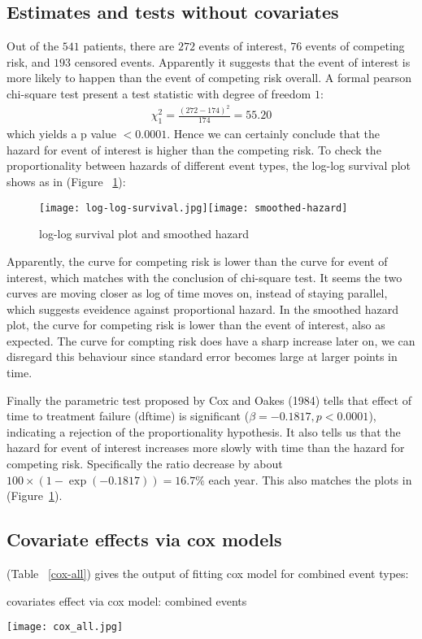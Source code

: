 \documentclass[times, doublespace]{simauth}
\begin{document}
\subsection{Estimates and tests without covariates}
Out of the $541$ patients, there are $272$ events of interest, $76$ events of competing risk, and $193$ censored events. Apparently it suggests that the event of interest is more likely to happen than the event of competing risk overall. A formal pearson chi-square test present a test statistic with degree of freedom $1$:
\begin{align*}
	\chi^2_1 = \frac{(272 - 174)^2}{174} = 55.20
\end{align*}
which yields a p value $<0.0001$. Hence we can certainly conclude that the hazard for event of interest is higher than the competing risk.\vskip 2mm
To check the proportionality between hazards of different event types, the log-log survival plot shows as in (Figure ~\ref{log-log}):
\begin{figure}[t]
	\begin{center}
		\caption{log-log survival plot and smoothed hazard}\label{log-log}
		\texttt{[image: log-log-survival.jpg]}\texttt{[image: smoothed-hazard]}
	\end{center}
\end{figure}
Apparently, the curve for competing risk is lower than the curve for event of interest, which matches with the conclusion of chi-square test. It seems the two curves are moving closer as log of time moves on, instead of staying parallel, which suggests eveidence against proportional hazard. In the smoothed hazard plot, the curve for competing risk is lower than the event of interest, also as expected. The curve for compting risk does have a sharp increase later on, we can disregard this behaviour since standard error becomes large at larger points in time.

Finally the parametric test proposed by Cox and Oakes (1984)\cite{Cox84} tells that effect of time to treatment failure (dftime) is significant ($\beta = -0.1817, p < 0.0001$), indicating a rejection of the proportionality hypothesis. It also tells us that the hazard for event of interest increases more slowly with time than the hazard for competing risk. Specifically the ratio decrease by about $100\times (1 - \exp(-0.1817)) = 16.7\%$ each year. This also matches the plots in (Figure~\ref{log-log}).

\subsection{Covariate effects via cox models}
(Table ~\ref{cox-all}) gives the output of fitting cox model for combined event types:
\begin{table}[!htb]
	\begin{center}
		\caption{covariates effect via cox model: combined events}\label{cox-all}
		\texttt{[image: cox\_all.jpg]}
	\end{center}
\end{table}
\end{document}

